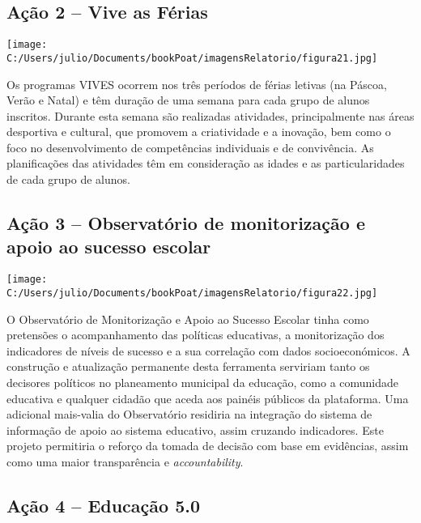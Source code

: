 \documentclass[
]{book}
\begin{document}
\hypertarget{auxe7uxe3o-2-vive-as-fuxe9rias}{%
\subsection{\texorpdfstring{\textbf{Ação 2 -- Vive as Férias}}{Ação 2 -- Vive as Férias}}\label{auxe7uxe3o-2-vive-as-fuxe9rias}}

\texttt{[image: C:/Users/julio/Documents/bookPoat/imagensRelatorio/figura21.jpg]}

Os programas VIVES ocorrem nos três períodos de férias letivas (na Páscoa, Verão e Natal) e têm duração de uma semana para cada grupo de alunos inscritos. Durante esta semana são realizadas atividades, principalmente nas áreas desportiva e cultural, que promovem a criatividade e a inovação, bem como o foco no desenvolvimento de competências individuais e de convivência. As planificações das atividades têm em consideração as idades e as particularidades de cada grupo de alunos.

\hypertarget{auxe7uxe3o-3-observatuxf3rio-de-monitorizauxe7uxe3o-e-apoio-ao-sucesso-escolar}{%
\subsection{\texorpdfstring{\textbf{Ação 3 -- Observatório de monitorização e apoio ao sucesso escolar}}{Ação 3 -- Observatório de monitorização e apoio ao sucesso escolar}}\label{auxe7uxe3o-3-observatuxf3rio-de-monitorizauxe7uxe3o-e-apoio-ao-sucesso-escolar}}

\texttt{[image: C:/Users/julio/Documents/bookPoat/imagensRelatorio/figura22.jpg]}

O Observatório de Monitorização e Apoio ao Sucesso Escolar tinha como pretensões o acompanhamento das políticas educativas, a monitorização dos indicadores de níveis de sucesso e a sua correlação com dados socioeconómicos. A construção e atualização permanente desta ferramenta serviriam tanto os decisores políticos no planeamento municipal da educação, como a comunidade educativa e qualquer cidadão que aceda aos painéis públicos da plataforma. Uma adicional mais-valia do Observatório residiria na integração do sistema de informação de apoio ao sistema educativo, assim cruzando indicadores. Este projeto permitiria o reforço da tomada de decisão com base em evidências, assim como uma maior transparência e \emph{accountability}.

\hypertarget{auxe7uxe3o-4-educauxe7uxe3o-5.0}{%
\subsection{\texorpdfstring{\textbf{Ação 4 -- Educação 5.0}}{Ação 4 -- Educação 5.0}}\label{auxe7uxe3o-4-educauxe7uxe3o-5.0}}
\end{document}
